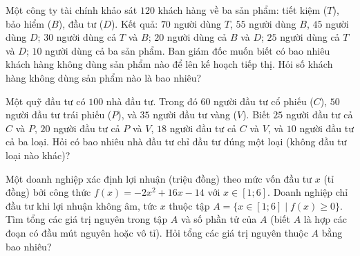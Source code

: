 
\begin{bt}%
	Một công ty tài chính khảo sát $120$ khách hàng về ba sản phẩm: tiết kiệm ($T$), bảo hiểm ($B$), đầu tư ($D$). Kết quả: $70$ người dùng $T$, $55$ người dùng $B$, $45$ người dùng $D$; $30$ người dùng cả $T$ và $B$; $20$ người dùng cả $B$ và $D$; $25$ người dùng cả $T$ và $D$; $10$ người dùng cả ba sản phẩm. Ban giám đốc muốn biết có bao nhiêu khách hàng không dùng sản phẩm nào để lên kế hoạch tiếp thị. Hỏi số khách hàng không dùng sản phẩm nào là bao nhiêu?
	
\end{bt}

\begin{bt}%
	Một quỹ đầu tư có $100$ nhà đầu tư. Trong đó $60$ người đầu tư cổ phiếu ($C$), $50$ người đầu tư trái phiếu ($P$), và $35$ người đầu tư vàng ($V$). Biết $25$ người đầu tư cả $C$ và $P$, $20$ người đầu tư cả $P$ và $V$, $18$ người đầu tư cả $C$ và $V$, và $10$ người đầu tư cả ba loại. Hỏi có bao nhiêu nhà đầu tư chỉ đầu tư đúng một loại (không đầu tư loại nào khác)?
	
\end{bt}

\begin{bt}%
	Một doanh nghiệp xác định lợi nhuận (triệu đồng) theo mức vốn đầu tư $x$ (tỉ đồng) bởi công thức $f(x)=-2x^2+16x-14$ với $x\in[1;6]$. Doanh nghiệp chỉ đầu tư khi lợi nhuận không âm, tức $x$ thuộc tập $A=\{x\in[1;6]\mid f(x)\ge 0\}$. Tìm tổng các giá trị nguyên trong tập $A$ và số phần tử của $A$ (biết $A$ là hợp các đoạn có đầu mút nguyên hoặc vô tỉ). Hỏi tổng các giá trị nguyên thuộc $A$ bằng bao nhiêu?
	
\end{bt}

